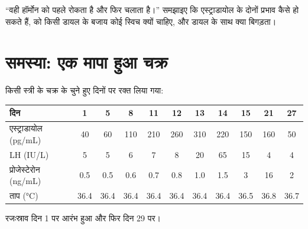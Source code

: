 \begin{exercise}[$\star\star\star$]\label{exo:b2:reproductive-hormones:12}
``वही हॉर्मोन  को पहले रोकता है और फिर चलाता है।''
समझाइए कि एस्ट्राडायोल के दोनों प्रभाव कैसे हो सकते हैं,  को
किसी डायल के बजाय कोई स्विच क्यों चाहिए, और डायल के साथ क्या बिगड़ता।
\end{exercise}

\section{समस्या: एक मापा हुआ चक्र}

\begin{problem}
\label{pb:b2:reproductive-hormones:1}
किसी स्त्री के चक्र के चुने हुए दिनों पर रक्त लिया गया:

\begin{center}
\small
\begin{tabular}{lcccccccccc}
\hline
दिन & 1 & 5 & 8 & 11 & 12 & 13 & 14 & 15 & 21 & 27 \\
\hline
एस्ट्राडायोल (\unit{pg/mL}) & 40 & 60 & 110 & 210 & 260 & 310 & 220 & 150 & 160 & 50 \\
LH (\unit{IU/L}) & 5 & 5 & 6 & 7 & 8 & 20 & 65 & 15 & 4 & 4 \\
प्रोजेस्टेरोन (\unit{ng/mL}) & 0.5 & 0.5 & 0.6 & 0.7 & 0.8 & 1.0 & 1.5 & 3 & 16 & 2 \\
ताप (\unit{\celsius}) & 36.4 & 36.4 & 36.4 & 36.4 & 36.4 & 36.4 & 36.4 & 36.5 & 36.8 & 36.7 \\
\hline
\end{tabular}
\end{center}

रजःस्राव दिन 1 पर आरंभ हुआ और फिर दिन 29 पर।


\end{problem}
